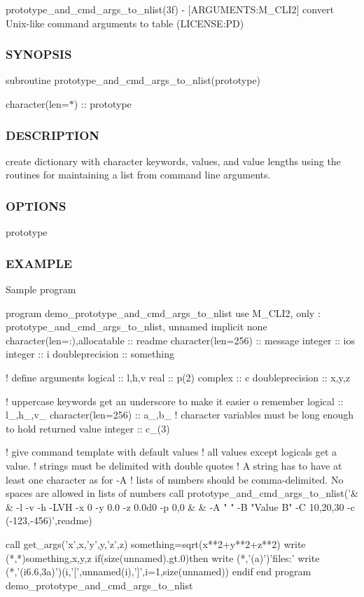 prototype\+\_\+and\+\_\+cmd\+\_\+args\+\_\+to\+\_\+nlist(3f) -\/ \mbox{[}A\+R\+G\+U\+M\+E\+N\+TS\+:M\+\_\+\+C\+L\+I2\mbox{]} convert Unix-\/like command arguments to table (L\+I\+C\+E\+N\+SE\+:PD) \subsubsection*{S\+Y\+N\+O\+P\+S\+IS}

subroutine prototype\+\_\+and\+\_\+cmd\+\_\+args\+\_\+to\+\_\+nlist(prototype)

character(len=$\ast$) \+:\+: prototype \subsubsection*{D\+E\+S\+C\+R\+I\+P\+T\+I\+ON}

create dictionary with character keywords, values, and value lengths using the routines for maintaining a list from command line arguments. \subsubsection*{O\+P\+T\+I\+O\+NS}

prototype \subsubsection*{E\+X\+A\+M\+P\+LE}

Sample program \begin{DoxyVerb} program demo_prototype_and_cmd_args_to_nlist
 use M_CLI2,  only : prototype_and_cmd_args_to_nlist, unnamed
 implicit none
 character(len=:),allocatable :: readme
 character(len=256)           :: message
 integer                      :: ios
 integer                      :: i
 doubleprecision              :: something

 ! define arguments
 logical            :: l,h,v
 real               :: p(2)
 complex            :: c
 doubleprecision    :: x,y,z

 ! uppercase keywords get an underscore to make it easier o remember
 logical            :: l_,h_,v_
 character(len=256) :: a_,b_                  ! character variables must be long enough to hold returned value
 integer            :: c_(3)

    ! give command template with default values
    ! all values except logicals get a value.
    ! strings must be delimited with double quotes
    ! A string has to have at least one character as for -A
    ! lists of numbers should be comma-delimited. No spaces are allowed in lists of numbers
    call prototype_and_cmd_args_to_nlist('&
    & -l -v -h -LVH -x 0 -y 0.0 -z 0.0d0 -p 0,0 &
    & -A " " -B "Value B" -C 10,20,30 -c (-123,-456)',readme)

    call get_args('x',x,'y',y,'z',z)
       something=sqrt(x**2+y**2+z**2)
       write (*,*)something,x,y,z
       if(size(unnamed).gt.0)then
          write (*,'(a)')'files:'
          write (*,'(i6.6,3a)')(i,'[',unnamed(i),']',i=1,size(unnamed))
       endif
 end program demo_prototype_and_cmd_args_to_nlist
\end{DoxyVerb}
